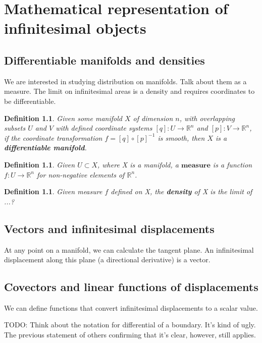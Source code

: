 \documentclass{book}
\newtheorem{defn}[equation]{Definition}
\begin{document}
\chapter{Mathematical representation of infinitesimal objects}



\section{Differentiable manifolds and densities}
We are interested in studying distribution on manifolds. Talk about them as a measure. The limit on infinitesimal areas is a density and requires coordinates to be differentiable.


\begin{defn}
	Given some manifold $X$ of dimension $n$, with overlapping subsets $U$ and $V$ with defined coordinate systems $[q]: U \to \mathbb{R}^n$ and $[p]: V \to \mathbb{R}^n$, if the coordinate transformation $f = [q] \circ [p]^{-1}$ is smooth, then $X$ is a \textbf{differentiable manifold}. 
\end{defn}

\begin{defn}
	Given $U \subset X$, where X is a manifold, a $\textbf{measure}$ is a function $f : U \to \mathbb{R}^n$ for non-negative elements of $\mathbb{R}^n$. 
\end{defn}

\begin{defn}
	Given measure $f$ defined on X, the \textbf{density} of X is the limit of ...?
\end{defn}



\section{Vectors and infinitesimal displacements}
At any point on a manifold, we can calculate the tangent plane. An infinitesimal displacement along this plane (a directional derivative) is a vector. 


\section{Covectors and linear functions of displacements}
We can define functions that convert infinitesimal displacements to a scalar value. 

TODO: Think about the notation for differential of a boundary. It's kind of ugly. The previous statement of others confirming that it's clear, however, still applies. 
\end{document}
